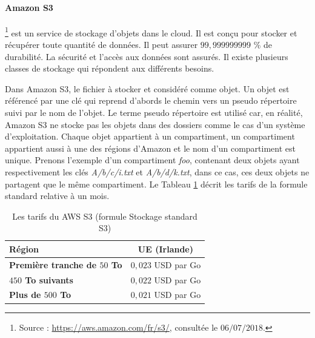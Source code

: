 
\paragraph{Amazon S3}
\footnote{Source : \url{https://aws.amazon.com/fr/s3/}, consultée le $06/07/2018$.} est un service de stockage d'objets dans le cloud. Il est conçu pour stocker et  récupérer toute quantité de données. Il peut assurer $ 99,999999999 $ \% de durabilité. La sécurité  et l'accès aux données sont assurés. Il existe plusieurs classes de stockage qui répondent aux différents besoins. 

Dans Amazon S3, le fichier à stocker et considéré comme objet. Un objet est référencé par une clé qui reprend d'abords le chemin vers un pseudo répertoire suivi par  le nom de l'objet.  Le terme pseudo répertoire est utilisé car, en réalité, Amazon S3 ne stocke pas les objets dans des dossiers comme le cas d'un système d'exploitation. Chaque objet appartient à un compartiment, un compartiment appartient aussi à une des régions d'Amazon et le nom d'un compartiment est unique. Prenons l'exemple d'un  compartiment \textit{foo}, contenant deux objets ayant respectivement les clés \textit{A/b/c/i.txt} et \textit{A/b/d/k.txt}, dans ce cas, ces deux objets ne partagent que le même compartiment.
Le Tableau   	\ref{tab:pricing-s3-standard} décrit les tarifs de la formule standard relative à un mois.
\begin{table}[H]
	\centering
	\captionsetup{justification=centering}
	\begin{tabular}{l c }
		\textbf{Région} & UE (Irlande) \\ \hline
		\textbf{Première tranche de $ 50 $ To} &	$ 0,023 $ USD par Go\\ \hline
		\textbf{$ 450 $ To suivants} &	$ 0,022 $ USD par Go \\ \hline
		\textbf{Plus de $ 500 $ To} &	$ 0,021 $ USD par Go\\ \hline
	\end{tabular}
	\caption{Les tarifs du AWS S3 (formule Stockage standard S3)}
	\label{tab:pricing-s3-standard}
\end{table}


